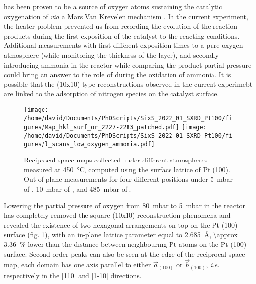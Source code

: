  has been proven to be a source of oxygen atoms sustaining the catalytic oxygenation of  \textit{via} a Mars Van Krevelen mechanism \parencite{Seriani2006, Seriani2008}.
In the current experiment, the heater problem prevented us from recording the evolution of the reaction products during the first exposition of the catalyst to the reacting conditions.
Additional measurements with first different exposition times to a pure oxygen atmosphere (while monitoring the thickness of the  layer), and secondly introducing ammonia in the reactor while comparing the product partial pressure could bring an answer to the role of  during the oxidation of ammonia.
It is possible that the (10x10)-type reconstructions observed in the current experimebt are linked to the adsorption of nitrogen species on the catalyst surface.

\begin{figure}[!htb]
    \centering
    \texttt{[image: /home/david/Documents/PhDScripts/SixS\_2022\_01\_SXRD\_Pt100/figures/Map\_hkl\_surf\_or\_2227-2283\_patched.pdf]}
    \texttt{[image: /home/david/Documents/PhDScripts/SixS\_2022\_01\_SXRD\_Pt100/figures/l\_scans\_low\_oxygen\_ammonia.pdf]}
    \caption{
        Reciprocal space maps collected under different atmospheres measured at \qty{450}{\degreeCelsius}, computed using the surface lattice of Pt (100).
        Out-of plane measurements for four different positions under \qty{5}{\milli\bar} of \dioxygen, \qty{10}{\milli\bar} of \ammonia, and \qty{485}{\milli\bar} of \argon.
    }
    \label{fig:MapsAndLScansPt100LowOxAmmonia}
\end{figure}

Lowering the partial pressure of oxygen from \qty{80}{\milli\bar} to \qty{5}{\milli\bar} in the reactor has completely removed the square (10x10) reconstruction phenomena and revealed the existence of two hexagonal arrangements on top on the Pt (100) surface (fig. \ref{fig:MapsAndLScansPt100LowOxAmmonia}), with an in-plane lattice parameter equal to \qty{2.685}{\angstrom}, \qty{\approx 3.36}{\percent} lower than the distance between neighbouring Pt atoms on the Pt (100) surface.
Second order peaks can also be seen at the edge of the reciprocal space map, each domain has one axis parallel to either $\vec{a}_{(100)}$ or $\vec{b}_{(100)}$, \textit{i.e.} respectively in the [110] and [1-10] directions.

